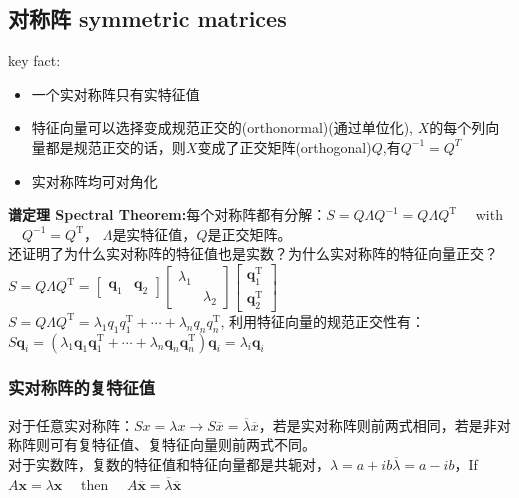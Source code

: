     \subsection{对称阵 symmetric matrices}
    key fact:
    \begin{itemize}
        \item 一个实对称阵只有实特征值
        \item 特征向量可以选择变成规范正交的(orthonormal)(通过单位化), $X$的每个列向量都是规范正交的话，则$X$变成了正交矩阵(orthogonal)$Q$,有$Q^{-1}=Q^{T}$
        \item 实对称阵均可对角化
    \end{itemize}
    \textbf{谱定理 Spectral Theorem:}每个对称阵都有分解：$S=Q \Lambda Q^{-1}=Q \Lambda Q^{\mathrm{T}} \quad$ with $\quad Q^{-1}=Q^{\mathrm{T}}$， $\Lambda$是实特征值，$Q$是正交矩阵。
    \\
    还证明了为什么实对称阵的特征值也是实数？为什么实对称阵的特征向量正交？\\
    $S=Q \Lambda Q^{\mathrm{T}}=\left[\begin{array}{ll}{\boldsymbol{q}_{1}} & {\boldsymbol{q}_{2}}\end{array}\right]\left[\begin{array}{ll}{\lambda_{1}} & {} \\ {} & {\lambda_{2}}\end{array}\right]\left[\begin{array}{l}{\boldsymbol{q}_{1}^{\mathrm{T}}} \\ {\boldsymbol{q}_{2}^{\mathrm{T}}}\end{array}\right]$\\
    $S=Q \Lambda Q^{\mathrm{T}}=\lambda_{1} q_{1} q_{1}^{\mathrm{T}}+\cdots+\lambda_{n} q_{n} q_{n}^{\mathrm{T}}$, 利用特征向量的规范正交性有：$S \boldsymbol{q}_{i}=\left(\lambda_{1} \boldsymbol{q}_{1} \boldsymbol{q}_{1}^{\mathrm{T}}+\cdots+\lambda_{n} \boldsymbol{q}_{n} \boldsymbol{q}_{n}^{\mathrm{T}}\right) \boldsymbol{q}_{i}=\lambda_{i} \boldsymbol{q}_{i}$

    \subsubsection{实对称阵的复特征值}
    对于任意实对称阵：$S x=\lambda x \rightarrow S \overline{x}=\overline{\lambda} \overline{x}$，若是实对称阵则前两式相同，若是非对称阵则可有复特征值、复特征向量则前两式不同。
    \\
    对于实数阵，复数的特征值和特征向量都是共轭对，$\lambda=a+i b$\quad $\overline{\lambda}=a-i b$，If $A \boldsymbol{x}=\lambda \boldsymbol{x} \quad$ then $\quad A \overline{\boldsymbol{x}}=\overline{\lambda} \overline{\boldsymbol{x}}$

